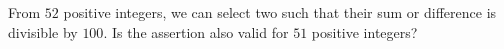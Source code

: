 From $52$ positive integers, we can select two such that their sum or difference is divisible by $100$. Is the assertion also valid for $51$ positive integers?
